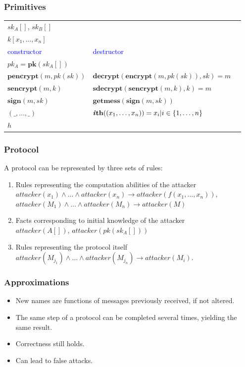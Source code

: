 \documentclass[10pt]{beamer}
\begin{document}
\newcommand{\fun}[1]{\textbf{#1}}

\begin{frame}
  \frametitle{Primitives}

  \begin{tabular}{lll}
    \multicolumn{2}{l}{$sk_A[]$, $sk_B[]$} \\
    \multicolumn{2}{l}{$k[x_1, \dots, x_n]$} \\[0.5em] \hline
    \textcolor{blue}{constructor} & \textcolor{blue}{destructor} \\
    $pk_A = \fun{pk}(sk_A[])$ & \\
    $\fun{pencrypt}(m, pk(sk))$ & $\fun{decrypt}(\fun{encrypt}(m, pk(sk)), sk) = m$ \\
    $\fun{sencrypt}(m, k)$ & $\fun{sdecrypt}(\fun{sencrypt}(m, k), k) = m$ \\
    $\fun{sign}(m, sk)$ & $\fun{getmess}(\fun{sign}(m, sk))$ \\
    $(\_, \dots, \_)$ & $\fun{\textit{i}th}((x_1, \dots, x_n)) = x_i | i \in \{1, \dots, n\}$ \\
    $h$ &
  \end{tabular}
\end{frame}

\newcommand{\myvspace}{\\[0.5em]}

\begin{frame}
  \frametitle{Protocol}

  A protocol can be represented by three sets of rules:
  \begin{enumerate}
    \item Rules representing the computation abilities of the attacker \myvspace
      $attacker(x_1) \land ... \land attacker(x_n) \rightarrow attacker(f(x_1, \dots, x_n))$, \myvspace
      $attacker(M_1) \land \dots \land attacker(M_n) \rightarrow attacker(M)$ \myvspace
    \item Facts corresponding to initial knowledge of the attacker \myvspace
      $attacker(A[])$, $attacker(pk(sk_A[]))$ \myvspace
    \item Rules representing the protocol itself \myvspace
      $attacker(M_{j_1}) \land \dots \land attacker(M_{j_n}) \rightarrow attacker(M_i)$.
  \end{enumerate}
\end{frame}

\begin{frame}
  \frametitle{Approximations}

  \begin{itemize}
    \item New names are functions of messages previously received, if not altered.
    \item The same step of a protocol can be completed several times, yielding the same result.\\[3em]
    \item Correctness still holds.
    \item Can lead to false attacks.
  \end{itemize}
\end{frame}
\end{document}
